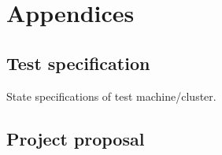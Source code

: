 \documentclass[12pt,a4paper,twoside,notitlepage]{report}
\theoremstyle{plain}
\theoremstyle{definition}
\theoremstyle{remark}
\begin{document}
\cleardoublepage


\cleardoublepage


\cleardoublepage


\cleardoublepage

\printbibliography[heading=bibintoc,category=cited]

\printbibliography[title={WARNING: Uncited},notcategory=cited]


\appendix
\chapter{Appendices}

\section{Test specification}
State specifications of test machine/cluster.
\clearpage

\clearpage
\section{Project proposal} \label{sec:proposal}

\end{document}
